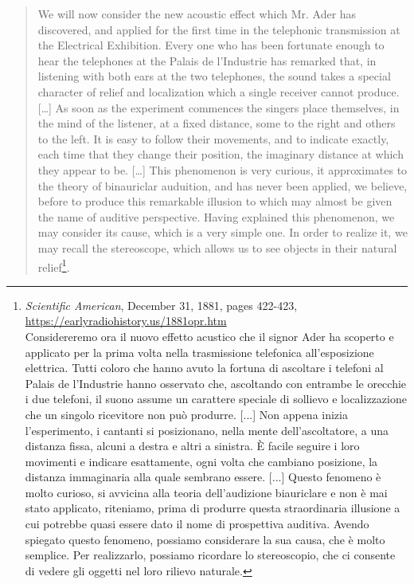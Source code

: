 \begin{quotation}
We will now consider the new acoustic effect which Mr. Ader has discovered, and
applied for the first time in the telephonic transmission at the Electrical
Exhibition. Every one who has been fortunate enough to hear the telephones at
the Palais de l'Industrie has remarked that, in listening with both ears at the
two telephones, the sound takes a special character of relief and localization
which a single receiver cannot produce. [\ldots] As soon as the experiment
commences the singers place themselves, in the mind of the listener, at a fixed
distance, some to the right and others to the left. It is easy to follow their
movements, and to indicate exactly, each time that they change their position,
the imaginary distance at which they appear to be. [\ldots] This phenomenon is
very curious, it approximates to the theory of binauriclar auduition, and has
never been applied, we believe, before to produce this remarkable illusion to
which may almost be given the name of auditive perspective. Having explained
this phenomenon, we may consider its cause, which is a very simple one. In order
to realize it, we may recall the stereoscope, which allows us to see objects in
their natural relief\footnote{
\emph{Scientific American}, December 31, 1881, pages 422-423,\\
\url{https://earlyradiohistory.us/1881opr.htm} \\
Considereremo ora il nuovo effetto acustico che il signor Ader ha scoperto e applicato per la prima volta nella trasmissione telefonica all'esposizione elettrica. Tutti coloro che hanno avuto la fortuna di ascoltare i telefoni al Palais de l'Industrie hanno osservato che, ascoltando con entrambe le orecchie i due telefoni, il suono assume un carattere speciale di sollievo e localizzazione che un singolo ricevitore non può produrre. [...] Non appena inizia l'esperimento, i cantanti si posizionano, nella mente dell'ascoltatore, a una distanza fissa, alcuni a destra e altri a sinistra. È facile seguire i loro movimenti e indicare esattamente, ogni volta che cambiano posizione, la distanza immaginaria alla quale sembrano essere. [...] Questo fenomeno è molto curioso, si avvicina alla teoria dell'audizione biauriclare e non è mai stato applicato, riteniamo, prima di produrre questa straordinaria illusione a cui potrebbe quasi essere dato il nome di prospettiva auditiva. Avendo spiegato questo fenomeno, possiamo considerare la sua causa, che è molto semplice. Per realizzarlo, possiamo ricordare lo stereoscopio, che ci consente di vedere gli oggetti nel loro rilievo naturale.}.
\end{quotation}


